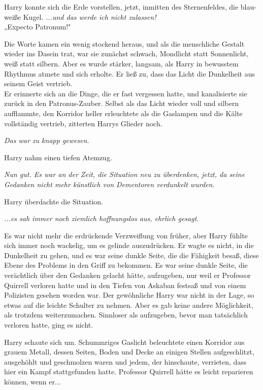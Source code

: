 {Harry konnte sich die Erde vorstellen, jetzt, inmitten des Sternenfeldes, die blau-weiße Kugel. \emph{...und das werde ich nicht zulassen!}\\

\hfill\break „Expecto Patronum!"

Die Worte kamen ein wenig stockend heraus, und als die menschliche Gestalt wieder ins Dasein trat, war sie zunächst schwach, Mondlicht statt Sonnenlicht, weiß statt silbern. Aber es wurde stärker, langsam, als Harry in bewusstem Rhythmus atmete und sich erholte. Er ließ zu, dass das Licht die Dunkelheit aus seinem Geist vertrieb.\\ Er erinnerte sich an die Dinge, die er fast vergessen hatte, und kanalisierte sie zurück in den Patronus-Zauber. Selbst als das Licht wieder voll und silbern aufflammte, den Korridor heller erleuchtete als die Gaslampen und die Kälte vollständig vertrieb, zitterten Harrys Glieder noch.

\emph{Das war zu knapp gewesen.}

Harry nahm einen tiefen Atemzug.

\emph{Nun gut. Es war an der Zeit, die Situation neu zu überdenken, jetzt, da seine Gedanken nicht mehr künstlich von Dementoren verdunkelt wurden.}

Harry überdachte die Situation.

\emph{...es sah immer noch ziemlich hoffnungslos aus, ehrlich gesagt}.

Es war nicht mehr die erdrückende Verzweiflung von früher, aber Harry fühlte sich immer noch wackelig, um es gelinde auszudrücken. Er wagte es nicht, in die Dunkelheit zu gehen, und es war seine dunkle Seite, die die Fähigkeit besaß, diese Ebene des Problems in den Griff zu bekommen. Es war seine dunkle Seite, die verächtlich über den Gedanken gelacht hätte, aufzugeben, nur weil er Professor Quirrell verloren hatte und in den Tiefen von Askaban festsaß und von einem Polizisten gesehen worden war. Der gewöhnliche Harry war nicht in der Lage, so etwas auf die leichte Schulter zu nehmen. Aber es gab keine andere Möglichkeit, als trotzdem weiterzumachen. Sinnloser als aufzugeben, bevor man tatsächlich verloren hatte, ging es nicht.

Harry schaute sich um. Schummriges Gaslicht beleuchtete einen Korridor aus grauem Metall, dessen Seiten, Boden und Decke an einigen Stellen aufgeschlitzt, ausgehöhlt und geschmolzen waren und jedem, der hinschaute, verrieten, dass hier ein Kampf stattgefunden hatte. Professor Quirrell hätte es leicht reparieren können, wenn er...

}
